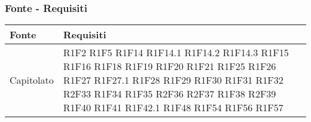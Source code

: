 \subsubsection{Fonte - Requisiti}
\begin{center}
	\begin{longtable}{|p{44mm}|p{22mm}|}
		\hline
		\rowcolor{lighter-grayer}
		\textbf{Fonte} &  \textbf{Requisiti}  \\
		\hline
		\endhead
		

Capitolato &
R1F2 \newline
R1F5 \newline
R1F14 \newline
R1F14.1 \newline
R1F14.2 \newline
R1F14.3 \newline
R1F15 \newline
R1F16 \newline
R1F18 \newline
R1F19 \newline
R1F20 \newline
R1F21 \newline
R1F25 \newline
R1F26 \newline
R1F27 \newline
R1F27.1 \newline
R1F28 \newline
R1F29 \newline
R1F30 \newline
R1F31 \newline
R1F32 \newline
R2F33 \newline
R1F34 \newline
R1F35 \newline
R2F36 \newline
R2F37 \newline
R1F38 \newline
R2F39 \newline
R1F40 \newline
R1F41 \newline
R1F42.1 \newline
R1F48 \newline
R1F54 \newline
R1F56 \newline
R1F57 \newline

\end{longtable}
\end{center}
